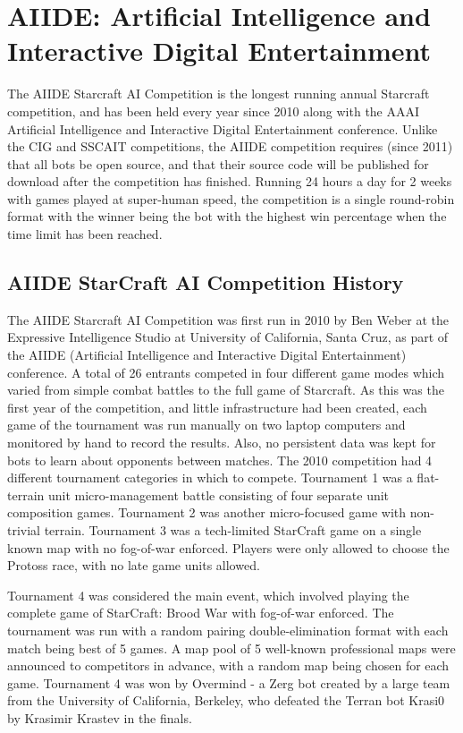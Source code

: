 \section{AIIDE: Artificial Intelligence and Interactive Digital Entertainment}\label{subsecAIIDE}

The AIIDE Starcraft AI Competition is the longest running annual Starcraft competition, and has been held every year since 2010 along with the AAAI Artificial Intelligence and Interactive Digital Entertainment conference. Unlike the CIG and SSCAIT competitions, the AIIDE competition requires (since 2011) that all bots be open source, and that their source code will be published for download after the competition has finished. Running 24 hours a day for 2 weeks with games played at super-human speed, the competition is a single round-robin format with the winner being the bot with the highest win percentage when the time limit has been reached. 

\subsection{AIIDE StarCraft AI Competition History}

The AIIDE Starcraft AI Competition was first run in 2010 by Ben Weber at the Expressive Intelligence Studio at University of California, Santa Cruz, as part of the AIIDE (Artificial Intelligence and Interactive Digital Entertainment) conference. A total of 26 entrants competed in four different game modes which varied from simple combat battles to the full game of Starcraft. As this was the first year of the competition, and little infrastructure had been created, each game of the tournament was run manually on two laptop computers and monitored by hand to record the results. Also, no persistent data was kept for bots to learn about opponents between matches. The 2010 competition had 4 different tournament categories in which to compete. Tournament 1 was a flat-terrain unit micro-management battle consisting of four separate unit composition games. Tournament 2 was another micro-focused game with non-trivial terrain. Tournament 3 was a tech-limited StarCraft game on a single known map with no fog-of-war enforced. Players were only allowed to choose the Protoss race, with no late game units allowed. 

Tournament 4 was considered the main event, which involved playing the complete game of StarCraft: Brood War with fog-of-war enforced. The tournament was run with a random pairing double-elimination format with each match being best of 5 games. A map pool of 5 well-known professional maps were announced to competitors in advance, with a random map being chosen for each game. Tournament 4 was won by Overmind - a Zerg bot created by a large team from the University of California, Berkeley, who defeated the Terran bot Krasi0 by Krasimir Krastev in the finals.

